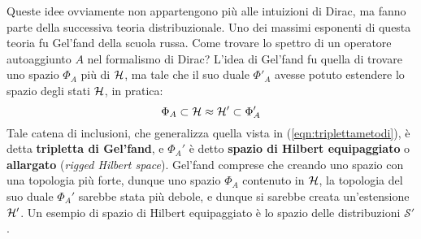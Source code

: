 \documentclass[../../FisicaTeorica.tex]{subfiles}
\begin{document}
Queste idee ovviamente non appartengono più alle intuizioni di Dirac, ma fanno parte della successiva teoria distribuzionale. Uno dei massimi esponenti di questa teoria fu Gel'fand della scuola russa. Come trovare lo spettro di un operatore autoaggiunto $A$ nel formalismo di Dirac? L'idea di Gel'fand fu quella di trovare uno spazio $\Phi_A$ più  di $\mathcal{H}$, ma tale che il suo duale $\Phi'_A$ avesse potuto estendere lo spazio degli stati $\mathcal{H}$, in pratica:
\begin{equation}
\Phi_A \subset \mathcal{H} \approx \mathcal{H}' \subset \Phi_A'
\label{tripletta-gelfand}
\end{equation}
Tale catena di inclusioni, che generalizza quella vista in (\ref{eqn:triplettametodi}), è detta \textbf{tripletta di Gel'fand}, e $\Phi_A'$ è detto \textbf{spazio di Hilbert equipaggiato} o \textbf{allargato} (\textit{rigged Hilbert space}). Gel'fand comprese che creando uno spazio con una topologia più forte, dunque uno spazio $\Phi_A$ contenuto in $\mathcal{H}$, la topologia del suo duale $\Phi_A'$ sarebbe stata più debole, e dunque si sarebbe creata un'estensione $\mathcal{H}'$. Un esempio di spazio di Hilbert equipaggiato è lo spazio delle distribuzioni $\mathcal S'$.
\end{document}
